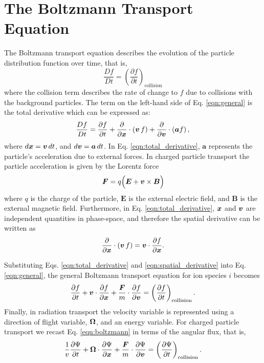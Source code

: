 \section{The Boltzmann Transport Equation}
The Boltzmann transport equation describes the evolution of the particle distribution function over time, that is,
\begin{equation} \label{eqn:general}
  \dfrac{D f}{D t} = \left( \dfrac{\partial f}{\partial t} \right)_{\text{collision}} 
\end{equation}
where the collision term describes the rate of change to $f$ due to collisions with the background particles. The term on the left-hand side of Eq. \eqref{eqn:general} is the total derivative which can be expressed as:
\begin{equation} \label{eqn:total_derivative}
    \dfrac{D f}{Dt} = \dfrac{\partial f}{\partial t} + \dfrac{\partial}{\partial \Bx} \cdot \left( \Bv \, f \right) + \dfrac{\partial}{\partial \Bv} \cdot \left( \boldsymbol{a} f \right),
\end{equation}
where $d\boldsymbol{x} = \boldsymbol{v} \, dt$, and $d\boldsymbol{v} = \boldsymbol{a} \, dt$. In Eq. \eqref{eqn:total_derivative}, $\boldsymbol{a}$ represents the particle's acceleration due to external forces. In charged particle transport the particle acceleration is given by the Lorentz force
\begin{equation} \label{eqn:lorentz}
  \boldsymbol{F} = q \Big( \boldsymbol{E} + \Bv \times \boldsymbol{B} \Big)
\end{equation}
where $q$ is the charge of the particle, $\boldsymbol{E}$ is the external electric field, and $\boldsymbol{B}$ is the external magnetic field. Furthermore, in Eq. \eqref{eqn:total_derivative}, $\boldsymbol{x}$ and $\boldsymbol{v}$ are independent quantities in phase-space, and therefore the spatial derivative can be written as
\begin{equation} \label{eqn:spatial_derivative}
  \dfrac{\partial}{\partial \Bx} \cdot \left( \Bv \, f \right) = \Bv \cdot \dfrac{\partial f}{\partial \Bx}.
\end{equation}

Substituting Eqs. \eqref{eqn:total_derivative} and \eqref{eqn:spatial_derivative} into Eq. \eqref{eqn:general}, the general Boltzmann transport equation for ion species $i$ becomes
\begin{equation} \label{eqn:boltzmann}
  \dfrac{\partial f}{\partial t} + \Bv \cdot \dfrac{\partial f}{\partial \Bx} + \dfrac{\boldsymbol{F}}{m} \cdot \dfrac{\partial f}{\partial \Bv} = \left( \dfrac{\partial f}{\partial t} \right)_{\text{collision}}.
\end{equation}
Finally, in radiation transport the velocity variable is represented using a direction of flight variable, $\boldsymbol{\Omega}$, and an energy variable. For charged particle transport we recast Eq. \eqref{eqn:boltzmann} in terms of the angular flux, that is,
\begin{equation} \label{eqn:general-boltzmann}
  \dfrac{1}{v} \dfrac{\partial \Psi}{\partial t} + \boldsymbol{\Omega} \cdot \dfrac{\partial \Psi}{\partial \Bx} + \dfrac{\boldsymbol{F}}{m} \cdot \dfrac{\partial \Psi}{\partial \Bv} = \left( \dfrac{\partial \Psi}{\partial t} \right)_{\text{collision}}.
\end{equation} 


